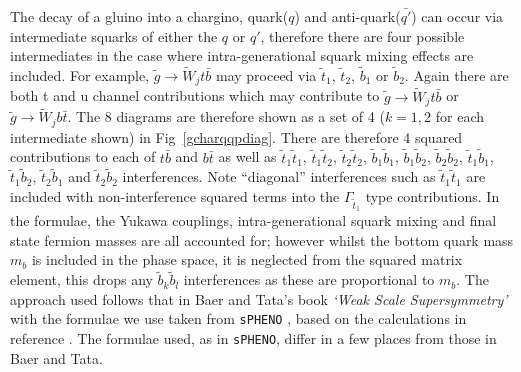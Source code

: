 \documentclass[final,3p,times,pdflatex]{elsarticle}
\begin{document}
The decay of a gluino into a chargino, quark($q$) and anti-quark($\bar{q'}$) can occur via intermediate squarks of either the $q$ or $q'$, therefore there are four possible intermediates in the case where intra-generational squark mixing effects are included. For example, $\tilde{g} \rightarrow \tilde{W}_j t \bar{b}$ may proceed via $\tilde{t}_1$, $\tilde{t}_2$, $\tilde{b}_1$ or $\tilde{b}_2$. Again there are both t and u channel contributions which may contribute to $\tilde{g} \rightarrow \tilde{W}_j t \bar{b}$ or $\tilde{g} \rightarrow \tilde{W}_j b \bar{t}$. The 8 diagrams are therefore shown as a set of 4 ($k = 1,2$ for each intermediate shown) in Fig~\ref{gcharqqpdiag}. There are therefore 4 squared contributions to each of $t \bar{b}$ and $b \bar{t}$ as well as $\tilde{t}_1 \tilde{t}_1$, $\tilde{t}_1 \tilde{t}_2$, $\tilde{t}_2 \tilde{t}_2$, $\tilde{b}_1 \tilde{b}_1$, $\tilde{b}_1 \tilde{b}_2$, $\tilde{b}_2 \tilde{b}_2$, $\tilde{t}_1 \tilde{b}_1$, $\tilde{t}_1 \tilde{b}_2$, $\tilde{t}_2 \tilde{b}_1$ and $\tilde{t}_2 \tilde{b}_2$ interferences. Note ``diagonal'' interferences such as $\tilde{t}_1 \tilde{t}_1$ are included with non-interference squared terms into the $\Gamma_{\tilde{t}_1}$ type contributions.  In the formulae, the Yukawa couplings, intra-generational squark mixing and final state fermion masses are all accounted for; however whilst the bottom quark mass $m_b$ is included in the phase space, it is neglected from the squared matrix element, this drops any $\tilde{b}_k \tilde{b}_l$ interferences as these are proportional to $m_b$. The approach used follows that in Baer and Tata's book \emph{`Weak Scale Supersymmetry'} \cite{TataBaer} with the formulae we use taken from {\tt sPHENO} \cite{Porod:2003um,Porod:2011}, based on the calculations in reference \cite{Baer:1998}. The formulae used, as in {\tt sPHENO}, differ in a few places from those in Baer and Tata.
\end{document}
